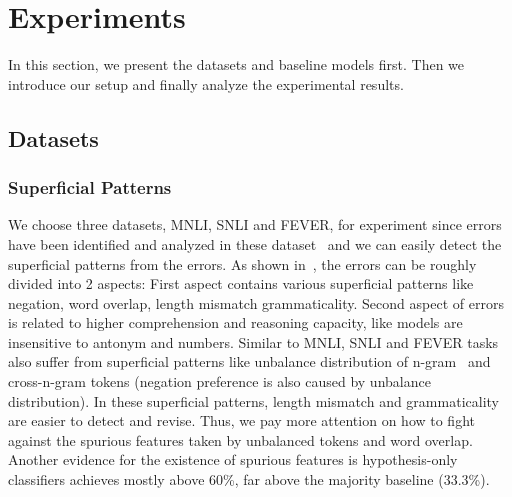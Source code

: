 \section{Experiments}
\label{sec:experiments}

In this section, we present the datasets and baseline models first. Then we introduce our setup 
and finally analyze the experimental results.

\subsection{Datasets}
\label{sec:dataset}

\subsubsection{Superficial Patterns}
\label{sec:patterns}
We choose three datasets, MNLI, SNLI and FEVER, for experiment since 
errors have been identified and analyzed in these dataset~\cite{naik2018stress,mccoy2019right,schuster2019towards,nie2019adversarial} and 
we can easily detect the superficial patterns from the errors. 
As shown in~, the errors can be roughly divided into 2 aspects: 
First aspect contains various superficial patterns like negation, word overlap, length mismatch 
grammaticality. Second aspect of errors is related to higher comprehension and reasoning capacity, like 
models are insensitive to antonym and numbers. 
Similar to MNLI, %
SNLI and FEVER tasks also suffer 
from superficial patterns like unbalance distribution of n-gram~\cite{bowman2015large} and
cross-n-gram tokens (negation preference is also caused by unbalance distribution). 
In these superficial patterns, length mismatch and 
grammaticality are easier to detect and revise. Thus, we pay more attention on 
how to fight against the spurious features taken by unbalanced tokens and word overlap. 
Another evidence for the existence of spurious features is hypothesis-only classifiers
achieves mostly above 60\%, far above the majority
baseline (33.3\%).


